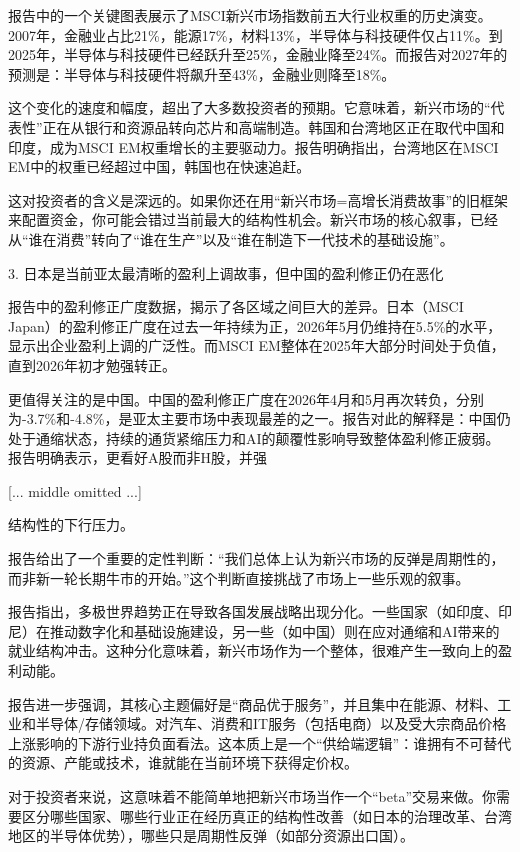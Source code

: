 \documentclass[11pt]{ctexart}
\begin{document}
报告中的一个关键图表展示了MSCI新兴市场指数前五大行业权重的历史演变。2007年，金融业占比21\%，能源17\%，材料13\%，半导体与科技硬件仅占11\%。到2025年，半导体与科技硬件已经跃升至25\%，金融业降至24\%。而报告对2027年的预测是：半导体与科技硬件将飙升至43\%，金融业则降至18\%。

这个变化的速度和幅度，超出了大多数投资者的预期。它意味着，新兴市场的“代表性”正在从银行和资源品转向芯片和高端制造。韩国和台湾地区正在取代中国和印度，成为MSCI EM权重增长的主要驱动力。报告明确指出，台湾地区在MSCI EM中的权重已经超过中国，韩国也在快速追赶。

这对投资者的含义是深远的。如果你还在用“新兴市场=高增长消费故事”的旧框架来配置资金，你可能会错过当前最大的结构性机会。新兴市场的核心叙事，已经从“谁在消费”转向了“谁在生产”以及“谁在制造下一代技术的基础设施”。

3. 日本是当前亚太最清晰的盈利上调故事，但中国的盈利修正仍在恶化

报告中的盈利修正广度数据，揭示了各区域之间巨大的差异。日本（MSCI Japan）的盈利修正广度在过去一年持续为正，2026年5月仍维持在5.5\%的水平，显示出企业盈利上调的广泛性。而MSCI EM整体在2025年大部分时间处于负值，直到2026年初才勉强转正。

更值得关注的是中国。中国的盈利修正广度在2026年4月和5月再次转负，分别为-3.7\%和-4.8\%，是亚太主要市场中表现最差的之一。报告对此的解释是：中国仍处于通缩状态，持续的通货紧缩压力和AI的颠覆性影响导致整体盈利修正疲弱。报告明确表示，更看好A股而非H股，并强

[... middle omitted ...]

结构性的下行压力。

报告给出了一个重要的定性判断：“我们总体上认为新兴市场的反弹是周期性的，而非新一轮长期牛市的开始。”这个判断直接挑战了市场上一些乐观的叙事。

报告指出，多极世界趋势正在导致各国发展战略出现分化。一些国家（如印度、印尼）在推动数字化和基础设施建设，另一些（如中国）则在应对通缩和AI带来的就业结构冲击。这种分化意味着，新兴市场作为一个整体，很难产生一致向上的盈利动能。

报告进一步强调，其核心主题偏好是“商品优于服务”，并且集中在能源、材料、工业和半导体/存储领域。对汽车、消费和IT服务（包括电商）以及受大宗商品价格上涨影响的下游行业持负面看法。这本质上是一个“供给端逻辑”：谁拥有不可替代的资源、产能或技术，谁就能在当前环境下获得定价权。

对于投资者来说，这意味着不能简单地把新兴市场当作一个“beta”交易来做。你需要区分哪些国家、哪些行业正在经历真正的结构性改善（如日本的治理改革、台湾地区的半导体优势），哪些只是周期性反弹（如部分资源出口国）。
\end{document}
